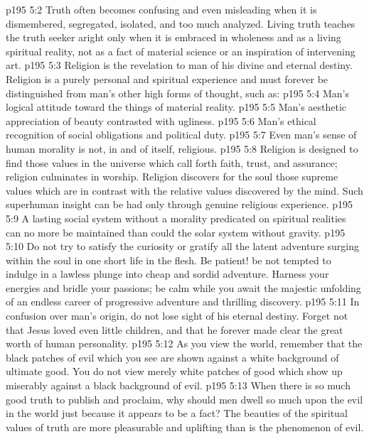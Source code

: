 \vs p195 5:2 Truth often becomes confusing and even misleading when it is dismembered, segregated, isolated, and too much analyzed. Living truth teaches the truth seeker aright only when it is embraced in wholeness and as a living spiritual reality, not as a fact of material science or an inspiration of intervening art.
\vs p195 5:3 Religion is the revelation to man of his divine and eternal destiny. Religion is a purely personal and spiritual experience and must forever be distinguished from man’s other high forms of thought, such as:
\pc \vs p195 5:4 \bibnobreakspace Man’s logical attitude toward the things of material reality.
\vs p195 5:5 \bibnobreakspace Man’s aesthetic appreciation of beauty contrasted with ugliness.
\vs p195 5:6 \bibnobreakspace Man’s ethical recognition of social obligations and political duty.
\vs p195 5:7 \bibnobreakspace Even man’s sense of human morality is not, in and of itself, religious.
\pc \vs p195 5:8 Religion is designed to find those values in the universe which call forth faith, trust, and assurance; religion culminates in worship. Religion discovers for the soul those supreme values which are in contrast with the relative values discovered by the mind. Such superhuman insight can be had only through genuine religious experience.
\vs p195 5:9 A lasting social system without a morality predicated on spiritual realities can no more be maintained than could the solar system without gravity.
\vs p195 5:10 Do not try to satisfy the curiosity or gratify all the latent adventure surging within the soul in one short life in the flesh. Be patient! be not tempted to indulge in a lawless plunge into cheap and sordid adventure. Harness your energies and bridle your passions; be calm while you await the majestic unfolding of an endless career of progressive adventure and thrilling discovery.
\pc \vs p195 5:11 In confusion over man’s origin, do not lose sight of his eternal destiny. Forget not that Jesus loved even little children, and that he forever made clear the great worth of human personality.
\pc \vs p195 5:12 As you view the world, remember that the black patches of evil which you see are shown against a white background of ultimate good. You do not view merely white patches of good which show up miserably against a black background of evil.
\vs p195 5:13 When there is so much good truth to publish and proclaim, why should men dwell so much upon the evil in the world just because it appears to be a fact? The beauties of the spiritual values of truth are more pleasurable and uplifting than is the phenomenon of evil.
